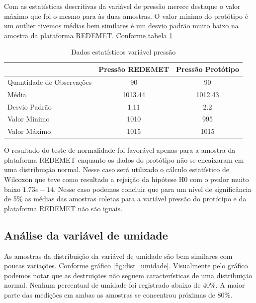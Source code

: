 Com as estatísticas descritivas da variável de pressão merece destaque o valor máximo que foi o mesmo para às duas amostras. O valor mínimo do protótipo é um outlier tivemos médias bem similares é um desvio padrão muito baixo na amostra da plataforma REDEMET. Conforme tabela \ref{tab:est_desc_pressao_prot}

\begin{table}[!h]
\centering
\begin{tabular}{l|c|c|}
\cline{2-3}
                                                & \multicolumn{1}{l|}{\textbf{Pressão REDEMET}} & \textbf{Pressão Protótipo} \\ \hline
\multicolumn{1}{|l|}{Quantidade de Observações} & 90                                            & 90                         \\ \hline
\multicolumn{1}{|l|}{Média}                     & 1013.44                                       & 1012.43                    \\ \hline
\multicolumn{1}{|l|}{Desvio Padrão}             & 1.11                                          & 2.2                        \\ \hline
\multicolumn{1}{|l|}{Valor Mínimo}              & 1010                                          & 995                        \\ \hline
\multicolumn{1}{|l|}{Valor Máximo}              & 1015                                          & 1015                       \\ \hline
\end{tabular}
\caption{Dados estatísticos variável pressão}
\label{tab:est_desc_pressao_prot}
\end{table}

O resultado do teste de normalidade foi favorável apenas para a amostra da plataforma REDEMET enquanto os dados do protótipo não se encaixaram em uma distribuição normal. Nesse caso será utilizado o cálculo estatístico de Wilcoxon que teve como resultado a rejeição da hipótese H0 com o pvalor muito baixo $1.73e-14$. Nesse caso podemos concluir que para um nível de significância de 5\% as médias das amostras coletas para a variável pressão do protótipo e da plataforma REDEMET não são iguais.

\subsection{Análise da variável de umidade}

As amostras da distribuição da variável de umidade são bem similares com poucas variações. Conforme gráfico \ref{fig:dist_umidade}. Visualmente pelo gráfico podemos notar que as destruições não seguem características de uma distribuição normal. Nenhum percentual de umidade foi registrado abaixo de 40\%. A maior parte das medições em ambas as amostras se concentrou próximas de 80\%.

